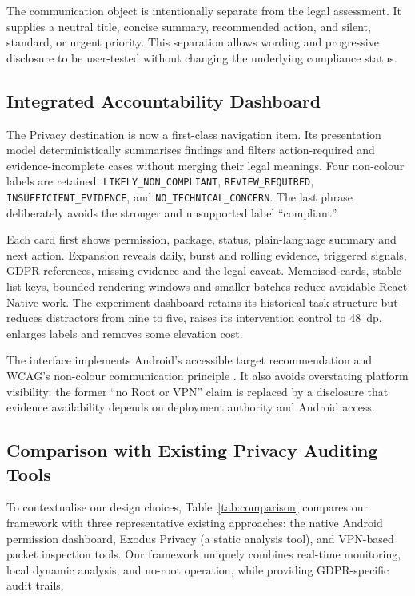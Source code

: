 The communication object is intentionally separate from the legal assessment. It supplies a neutral title, concise summary, recommended action, and silent, standard, or urgent priority. This separation allows wording and progressive disclosure to be user-tested without changing the underlying compliance status.

\subsection{Integrated Accountability Dashboard}

The Privacy destination is now a first-class navigation item. Its presentation model deterministically summarises findings and filters action-required and evidence-incomplete cases without merging their legal meanings. Four non-colour labels are retained: \texttt{LIKELY\_NON\_COMPLIANT}, \texttt{REVIEW\_REQUIRED}, \texttt{INSUFFICIENT\_EVIDENCE}, and \texttt{NO\_TECHNICAL\_CONCERN}. The last phrase deliberately avoids the stronger and unsupported label ``compliant''.

Each card first shows permission, package, status, plain-language summary and next action. Expansion reveals daily, burst and rolling evidence, triggered signals, GDPR references, missing evidence and the legal caveat. Memoised cards, stable list keys, bounded rendering windows and smaller batches reduce avoidable React Native work. The experiment dashboard retains its historical task structure but reduces distractors from nine to five, raises its intervention control to 48~dp, enlarges labels and removes some elevation cost.

The interface implements Android's accessible target recommendation and WCAG's non-colour communication principle \cite{androidaccess,wcag22}. It also avoids overstating platform visibility: the former ``no Root or VPN'' claim is replaced by a disclosure that evidence availability depends on deployment authority and Android access.

\subsection{Comparison with Existing Privacy Auditing Tools}

To contextualise our design choices, Table~\ref{tab:comparison} compares our framework with three representative existing approaches: the native Android permission dashboard, Exodus Privacy (a static analysis tool), and VPN-based packet inspection tools. Our framework uniquely combines real-time monitoring, local dynamic analysis, and no-root operation, while providing GDPR-specific audit trails.

